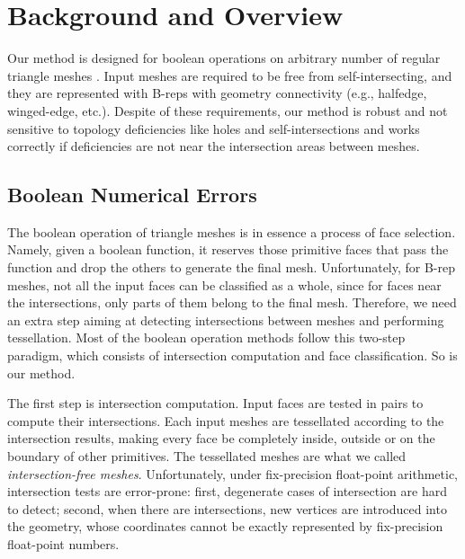 \documentclass[10pt,journal,compsoc]{IEEEtran}
\begin{document}
\section{Background and Overview}

\label{sec:overview}
Our method is designed for boolean operations on arbitrary number of regular triangle meshes \cite{requicha1985boolean}. Input meshes are required to be free from self-intersecting, and they are represented with B-reps with geometry connectivity (e.g., halfedge, winged-edge, etc.). Despite of these requirements, our method is robust and not sensitive to topology deficiencies like holes and self-intersections and works correctly if deficiencies are not near the intersection areas between meshes.


\subsection{Boolean Numerical Errors}
\label{sec:paradigm}

The boolean operation of triangle meshes is in essence a process of face selection. Namely, given a boolean function, it reserves those primitive faces that pass the function and drop the others to generate the final mesh. Unfortunately, for B-rep meshes, not all the input faces can be classified as a whole, since for faces near the intersections, only parts of them belong to the final mesh. Therefore, we need an extra step aiming at detecting intersections between meshes and performing tessellation. Most of the boolean operation methods follow this two-step paradigm, which consists of intersection computation and face classification. So is our method.

The first step is intersection computation. Input faces are tested in pairs to compute their intersections. Each input meshes are tessellated according to the intersection results, making every face be completely inside, outside or on the boundary of other primitives. The tessellated meshes are what we called \emph{intersection-free meshes}. Unfortunately, under fix-precision float-point arithmetic, intersection tests are error-prone: first, degenerate cases of intersection are hard to detect; second, when there are intersections, new vertices are introduced into the geometry, whose coordinates cannot be exactly represented by fix-precision float-point numbers.
\end{document}
